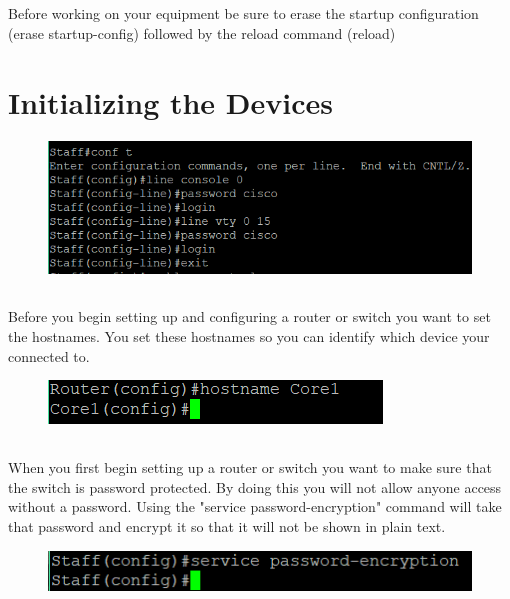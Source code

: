 \documentclass{article}
\begin{document}
\subsection{}
	Before working on your equipment be sure to erase the startup configuration (erase startup-config) followed by the reload command (reload)
	\newpage
\section{Initializing the Devices}
\begin{figure}[h]
		\includegraphics[width=1\linewidth]{"staff passwords"}
		\caption{}
\end{figure}
\subsection{}
	Before you begin setting up and configuring a router or switch you want to set the hostnames. You set these hostnames so you can identify which device your connected to. 
\begin{figure}[h]
		\includegraphics[width=1\linewidth]{hostname}
		\caption{}
\end{figure}
\subsection{}
	When you first begin setting up a router or switch you want to make sure that the switch is password protected. By doing this you will not allow anyone access without a password. Using the "service password-encryption" command will take that password and encrypt it so that it will not be shown in plain text.
\begin{figure}[h]
		\includegraphics[width=1\linewidth]{"staff password encryption"}
		\caption{}
\end{figure}
\end{document}
